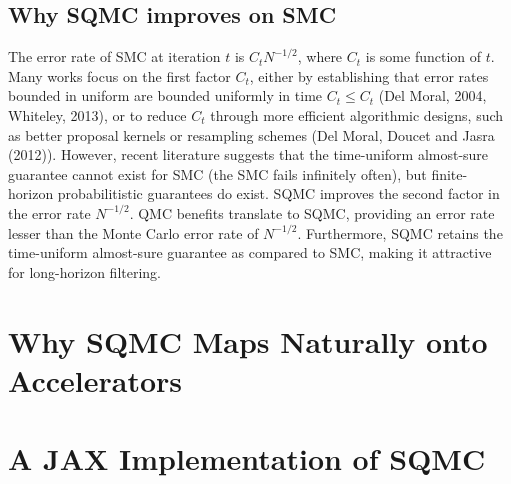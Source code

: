 



\subsection{Why SQMC improves on SMC}



The error rate of SMC at iteration $t$ is $C_t N^{-1/2}$, where $C_t$ is some function of $t$. Many works focus on the first factor $C_t$, either by establishing that error rates bounded in uniform are bounded uniformly in time $C_t \leq C_t$ (Del Moral, 2004, Whiteley, 2013), or to reduce $C_t$ through more efficient algorithmic designs, such as better proposal kernels or resampling schemes (Del Moral, Doucet and Jasra (2012)). However, recent literature suggests that the time-uniform almost-sure guarantee cannot exist for SMC (the SMC fails infinitely often), but finite-horizon probabilitistic guarantees do exist. SQMC improves the second factor in the error rate $N^{-1/2}$. QMC benefits translate to SQMC, providing an error rate lesser than the Monte Carlo error rate of $N^{-1/2}$. Furthermore, SQMC retains the time-uniform almost-sure guarantee as compared to SMC, making it attractive for long-horizon filtering.



\section{Why SQMC Maps Naturally onto Accelerators}


\section{A JAX Implementation of SQMC}

